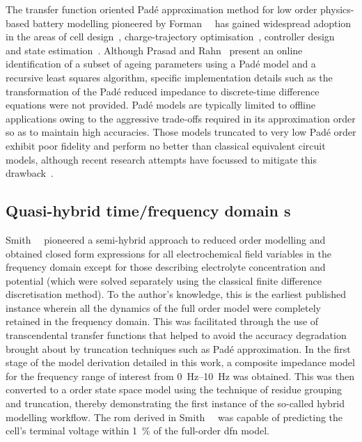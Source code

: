 The     transfer     function     oriented    Padé     approximation     method
for    low    order    physics-based     battery    modelling    pioneered    by
Forman~\etal{}~\cite{Forman2011a}    has   gained    widespread   adoption    in
the    areas     of    cell     design~\cite{Marcicki2013},    charge-trajectory
optimisation~\cite{Bashash2010},    controller    design~\cite{Perez2015}    and
state    estimation~\cite{Marcicki2013,Moura2012}.     Although    Prasad    and
Rahn~\cite{Prasad2013} present  an online identification  of a subset  of ageing
parameters  using  a  Padé  model  and a  recursive  least  squares  algorithm,
specific  implementation  details  such  as  the  transformation  of  the  Padé
reduced  impedance  to discrete-time  difference  equations  were not  provided.
Padé  models  are  typically  limited  to offline  applications  owing  to  the
aggressive  trade-offs required  in its  approximation order  so as  to maintain
high  accuracies.  Those  models  truncated  to very  low  Padé  order  exhibit
poor  fidelity  and   perform  no  better  than   classical  equivalent  circuit
models,  although  recent  research  attempts have  focussed  to  mitigate  this
drawback~\cite{Yuan2017a,Yuan2017}.


\subsection{Quasi-hybrid time/frequency domain s}

Smith~\etal{}~\cite{Smith2007} pioneered a semi-hybrid approach to reduced order
modelling and  obtained closed  form expressions  for all  electrochemical field
variables  in  the frequency  domain  except  for those  describing  electrolyte
concentration and  potential (which were  solved separately using  the classical
finite difference discretisation method). To the author's knowledge, this is the
earliest published  instance wherein all  the dynamics  of the full  order model
were completely retained  in the frequency domain. This  was facilitated through
the use of  transcendental transfer functions that helped to  avoid the accuracy
degradation brought about by truncation  techniques such as Padé approximation.
In the first  stage of the model  derivation detailed in this  work, a composite
impedance model for the frequency range of interest from \SIrange{0}{10}{\hertz}
was  obtained.  This was  then  converted  to  a   order  state
space  model using  the technique  of residue  grouping and  truncation, thereby
demonstrating the first instance of the so-called hybrid modelling workflow. The
\gls{rom} derived  in Smith~\etal{}~\cite{Smith2007}  was capable  of predicting
the cell's terminal voltage within  \SI{1}{\percent} of the full-order \gls{dfn}
model.


